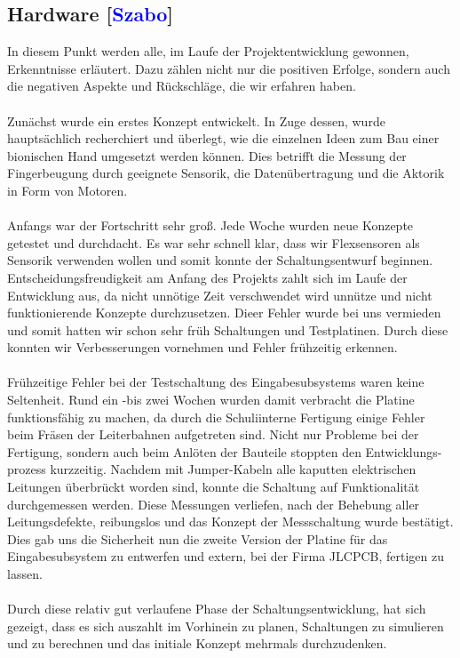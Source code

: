\documentclass[titlepage,12pt,twoside]{article}
\begin{document}
\subsection{Hardware [\textcolor{blue}{Szabo}]}
In diesem Punkt werden alle, im Laufe der Projektentwicklung gewonnen, Erkenntnisse erläutert. Dazu zählen nicht nur die
positiven Erfolge, sondern auch die negativen Aspekte und Rückschläge, die wir erfahren haben. \\
\\
Zunächst wurde ein erstes Konzept entwickelt. In Zuge dessen, wurde hauptsächlich recherchiert und überlegt, wie die 
einzelnen Ideen zum Bau einer bionischen Hand umgesetzt werden können. Dies betrifft die Messung der Fingerbeugung durch geeignete Sensorik, 
die Datenübertragung und die Aktorik in Form von Motoren. \\
\\
Anfangs war der Fortschritt sehr groß. Jede Woche wurden neue Konzepte getestet und durchdacht. Es war sehr schnell klar, dass wir Flexsensoren
als Sensorik verwenden wollen und somit konnte der Schaltungsentwurf beginnen. Entscheidungsfreudigkeit am Anfang des Projekts zahlt sich im Laufe der Entwicklung aus,
da nicht unnötige Zeit verschwendet wird unnütze und nicht funktionierende Konzepte durchzusetzen. Dieer Fehler wurde bei uns vermieden und somit hatten wir schon sehr früh 
Schaltungen und Testplatinen. Durch diese konnten wir Verbesserungen vornehmen und Fehler frühzeitig erkennen. \\
\\
Frühzeitige Fehler bei der Testschaltung des Eingabesubsystems waren keine Seltenheit. Rund ein -bis zwei Wochen wurden damit verbracht die Platine funktionsfähig zu machen, da 
durch die Schuliinterne Fertigung einige Fehler beim Fräsen der Leiterbahnen aufgetreten sind. Nicht nur Probleme bei der Fertigung, sondern auch beim Anlöten der Bauteile stoppten 
den Entwicklungs-\\prozess kurzzeitig. Nachdem mit Jumper-Kabeln alle kaputten elektrischen Leitungen überbrückt worden sind, konnte die Schaltung auf Funktionalität durchgemessen werden.
Diese Messungen verliefen, nach der Behebung aller Leitungsdefekte, reibungslos und das Konzept der Messschaltung wurde bestätigt. Dies gab uns die Sicherheit nun die zweite Version der
Platine für das Eingabesubsystem zu entwerfen und extern, bei der Firma JLCPCB, fertigen zu lassen. \\
\\
Durch diese relativ gut verlaufene Phase der Schaltungsentwicklung, hat sich gezeigt, dass es sich auszahlt im Vorhinein zu planen, Schaltungen zu simulieren und zu berechnen und das initiale Konzept mehrmals durchzudenken. \\
\end{document}
